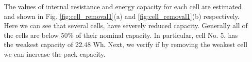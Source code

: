 \documentclass[10pt,twocolumn]{IEEEtran}
\begin{document}




%


The  values of  internal resistance and energy capacity for each cell are estimated and shown in Fig. \ref{fig:cell_removal1}(a) and \ref{fig:cell_removal1}(b) respectively.
Here we can see that several cells, have severely reduced capacity. 
Generally all of the cells are below 50\%  of their nominal capacity.
In particular, cell No. 5, has the weakest capacity of 22.48 Wh. 
Next, we verify if by removing the weakest cell we can increase the pack capacity.
\end{document}
